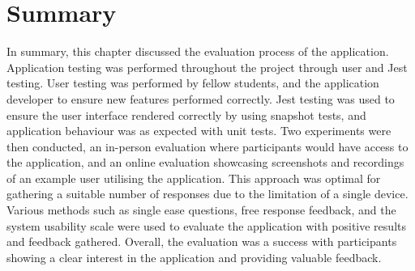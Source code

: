 \section{Summary}

In summary, this chapter discussed the evaluation process of the application. Application testing was performed throughout the project through user and Jest testing. User testing was performed by fellow students, and the application developer to ensure new features performed correctly. Jest testing was used to ensure the user interface rendered correctly by using snapshot tests, and application behaviour was as expected with unit tests. Two experiments were then conducted, an in-person evaluation where participants would have access to the application, and an online evaluation showcasing screenshots and recordings of an example user utilising the application. This approach was optimal for gathering a suitable number of responses due to the limitation of a single device. Various methods such as single ease questions, free response feedback, and the system usability scale were used to evaluate the application with positive results and feedback gathered. Overall, the evaluation was a success with participants showing a clear interest in the application and providing valuable feedback. 
